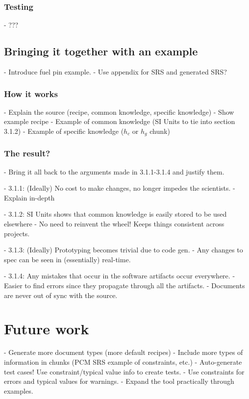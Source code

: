 \documentclass{sig-alternate-05-2015}
\begin{document}
\subsubsection{Testing} \label{sssec:adv_test}%

- ???

\subsection{Bringing it together with an example} \label{ssec:example}

- Introduce fuel pin example.
- Use appendix for SRS and generated SRS?

\subsubsection{How it works} \label{sssec:ex_how}
- Explain the source (recipe, common knowledge, specific knowledge)
- Show example recipe
- Example of common knowledge (SI Units to tie into section 3.1.2)
- Example of specific knowledge ($h_c$ or $h_g$ chunk)

\subsubsection{The result?} \label{sssec:ex_result}

- Bring it all back to the arguments made in 3.1.1-3.1.4 and justify them.

- 3.1.1: (Ideally) No cost to make changes, no longer impedes the scientists.
    - Explain in-depth

- 3.1.2: SI Units shows that common knowledge is easily stored to be used elsewhere
    - No need to reinvent the wheel! Keeps things consistent across projects.
    
- 3.1.3: (Ideally) Prototyping becomes trivial due to code gen.
    - Any changes to spec can be seen in (essentially) real-time.
    
- 3.1.4: Any mistakes that occur in the software artifacts occur everywhere.
    - Easier to find errors since they propagate through all the artifacts.
    - Documents are never out of sync with the source.

\section{Future work} \label{sec:todo}

- Generate more document types (more default recipes)
- Include more types of information in chunks (PCM SRS example of constraints, etc.)
  - Auto-generate test cases! Use constraint/typical value info to create tests.
  - Use constraints for errors and typical values for warnings.
- Expand the tool practically through examples.
    
\end{document}
